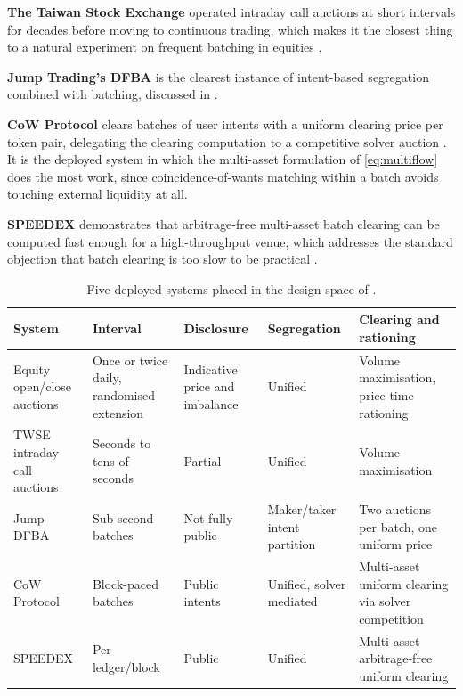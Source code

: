 \textbf{The Taiwan Stock Exchange} operated intraday call auctions at
short intervals for decades before moving to continuous trading, which
makes it the closest thing to a natural experiment on frequent batching
in equities \citep{lee2026taiwan}.

\textbf{Jump Trading's DFBA} is the clearest instance of intent-based
segregation combined with batching, discussed in
.

\textbf{CoW Protocol} clears batches of user intents with a uniform
clearing price per token pair, delegating the clearing computation to a
competitive solver auction \citep{dutta2025cow,harrison2025hybrid}. It
is the deployed system in which the multi-asset formulation of
\eqref{eq:multiflow} does the most work, since coincidence-of-wants
matching within a batch avoids touching external liquidity at all.

\textbf{SPEEDEX} demonstrates that arbitrage-free multi-asset batch
clearing can be computed fast enough for a high-throughput venue, which
addresses the standard objection that batch clearing is too slow to be
practical \citep{ramsay2023speedex}.

\begin{table}[htbp]
\centering
\caption[Deployed batch auction systems in the design space]{Five
deployed systems placed in the design space of .}
\label{tab:casestudies}
\small
\begin{tabularx}{\textwidth}{@{}p{2.6cm} p{2.0cm} p{2.4cm} p{2.3cm} L@{}}
\toprule
\textbf{System} & \textbf{Interval} & \textbf{Disclosure} &
\textbf{Segregation} & \textbf{Clearing and rationing}\\
\midrule
Equity open/close auctions & Once or twice daily, randomised extension &
Indicative price and imbalance & Unified & Volume maximisation,
price-time rationing\\
TWSE intraday call auctions & Seconds to tens of seconds & Partial &
Unified & Volume maximisation\\
Jump DFBA & Sub-second batches & Not fully public & Maker/taker intent
partition & Two auctions per batch, one uniform price\\
CoW Protocol & Block-paced batches & Public intents & Unified, solver
mediated & Multi-asset uniform clearing via solver competition\\
SPEEDEX & Per ledger/block & Public & Unified & Multi-asset
arbitrage-free uniform clearing\\
\bottomrule
\end{tabularx}
\end{table}

